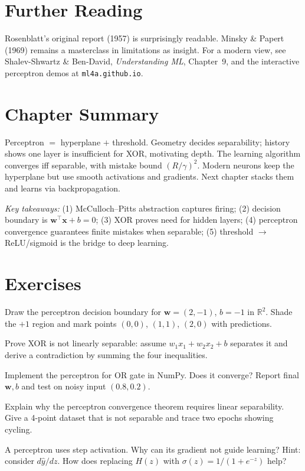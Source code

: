 \section{Further Reading}
Rosenblatt's original report (1957) is surprisingly readable. Minsky \& Papert
(1969) remains a masterclass in limitations as insight. For a modern view, see
Shalev-Shwartz \& Ben-David, \emph{Understanding ML}, Chapter~9, and the
interactive perceptron demos at \texttt{ml4a.github.io}.

\section{Chapter Summary}
Perceptron $=$ hyperplane $+$ threshold. Geometry decides separability; history
shows one layer is insufficient for XOR, motivating depth. The learning
algorithm converges iff separable, with mistake bound $(R/\gamma)^2$.
Modern neurons keep the hyperplane but use smooth activations and gradients.
Next chapter stacks them and learns via backpropagation.

\smallskip
\noindent\textit{Key takeaways:} (1) McCulloch--Pitts abstraction captures
firing; (2) decision boundary is $\mathbf{w}^{\top}\mathbf{x}+b=0$;
(3) XOR proves need for hidden layers; (4) perceptron convergence guarantees
finite mistakes when separable; (5) threshold $\to$ ReLU/sigmoid is the bridge
to deep learning.

\section{Exercises}
\begin{exercise} Draw the perceptron decision boundary for $\mathbf{w}=(2,-1)$, $b=-1$ in $\mathbb{R}^2$. Shade the $+1$ region and mark points $(0,0)$, $(1,1)$, $(2,0)$ with predictions.\end{exercise}
\begin{exercise} Prove XOR is not linearly separable: assume $w_1x_1+w_2x_2+b$ separates it and derive a contradiction by summing the four inequalities.\end{exercise}
\begin{exercise} Implement the perceptron for OR gate in NumPy. Does it converge? Report final $\mathbf{w},b$ and test on noisy input $(0.8,0.2)$.\end{exercise}
\begin{exercise} Explain why the perceptron convergence theorem requires linear separability. Give a 4-point dataset that is not separable and trace two epochs showing cycling.\end{exercise}
\begin{exercise} A perceptron uses step activation. Why can its gradient not guide learning? Hint: consider $d\hat y/dz$. How does replacing $H(z)$ with $\sigma(z)=1/(1+e^{-z})$ help?\end{exercise}
